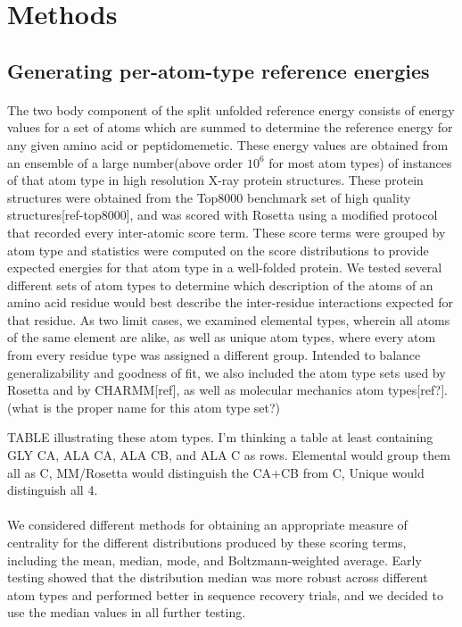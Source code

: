 \section{Methods}

\subsection{Generating per-atom-type reference energies}
\paragraph{}
The two body component of the split unfolded reference energy consists of energy values for a set of atoms which are summed to determine the reference energy for any given amino acid or peptidomemetic. These energy values are obtained from an ensemble of a large number(above order $10^6$ for most atom types) of instances of that atom type in high resolution X-ray protein structures. These protein structures were obtained from the Top8000 benchmark set of high quality structures[ref-top8000], and was scored with Rosetta using a modified protocol that recorded every inter-atomic score term. These score terms were grouped by atom type and statistics were computed on the score distributions to provide expected energies for that atom type in a well-folded protein. We tested several different sets of atom types to determine which description of the atoms of an amino acid residue would best describe the inter-residue interactions expected for that residue. As two limit cases, we examined elemental types, wherein all atoms of the same element are alike, as well as unique atom types, where every atom from every residue type was assigned a different group. Intended to balance generalizability and goodness of fit, we also included the atom type sets used by Rosetta and by CHARMM[ref], as well as molecular mechanics atom types[ref?]. (what is the proper name for this atom type set?)

TABLE illustrating these atom types. I'm thinking a table at least containing GLY CA, ALA CA, ALA CB, and ALA C as rows. Elemental would group them all as C, MM/Rosetta would distinguish the CA+CB from C, Unique would distinguish all 4.

\paragraph{}
We considered different methods for obtaining an appropriate measure of centrality for the different distributions produced by these scoring terms, including the mean, median, mode, and Boltzmann-weighted average. Early testing showed that the distribution median was more robust across different atom types and performed better in sequence recovery trials, and we decided to use the median values in all further testing.


